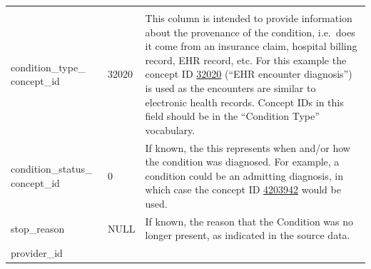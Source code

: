 \documentclass[11pt]{book}
\theoremstyle{definition}
\theoremstyle{definition}
\theoremstyle{definition}
\theoremstyle{remark}
\begin{document}
\begin{longtable}[]{@{}lll@{}}
\begin{minipage}[t]{0.49\columnwidth}
\end{minipage}\tabularnewline
\begin{minipage}[t]{0.28\columnwidth}\raggedright
condition\_type\_ concept\_id\strut
\end{minipage} & \begin{minipage}[t]{0.15\columnwidth}\raggedright
32020\strut
\end{minipage} & \begin{minipage}[t]{0.49\columnwidth}\raggedright
This column is intended to provide information about the provenance of the condition, i.e.~does it come from an insurance claim, hospital billing record, EHR record, etc. For this example the concept ID \href{http://athena.ohdsi.org/search-terms/terms/32020}{32020} (``EHR encounter diagnosis'') is used as the encounters are similar to electronic health records. Concept IDs in this field should be in the ``Condition Type'' vocabulary.\strut
\end{minipage}\tabularnewline
\begin{minipage}[t]{0.28\columnwidth}\raggedright
condition\_status\_ concept\_id\strut
\end{minipage} & \begin{minipage}[t]{0.15\columnwidth}\raggedright
0\strut
\end{minipage} & \begin{minipage}[t]{0.49\columnwidth}\raggedright
If known, the this represents when and/or how the condition was diagnosed. For example, a condition could be an admitting diagnosis, in which case the concept ID \href{http://athena.ohdsi.org/search-terms/terms/4203942}{4203942} would be used.\strut
\end{minipage}\tabularnewline
\begin{minipage}[t]{0.28\columnwidth}\raggedright
stop\_reason\strut
\end{minipage} & \begin{minipage}[t]{0.15\columnwidth}\raggedright
NULL\strut
\end{minipage} & \begin{minipage}[t]{0.49\columnwidth}\raggedright
If known, the reason that the Condition was no longer present, as indicated in the source data.\strut
\end{minipage}\tabularnewline
\begin{minipage}[t]{0.28\columnwidth}\raggedright
provider\_id\strut
\end{minipage} & \begin{minipage}[t]{0.15\columnwidth}\raggedright

\end{minipage}
\end{longtable}
\end{document}
